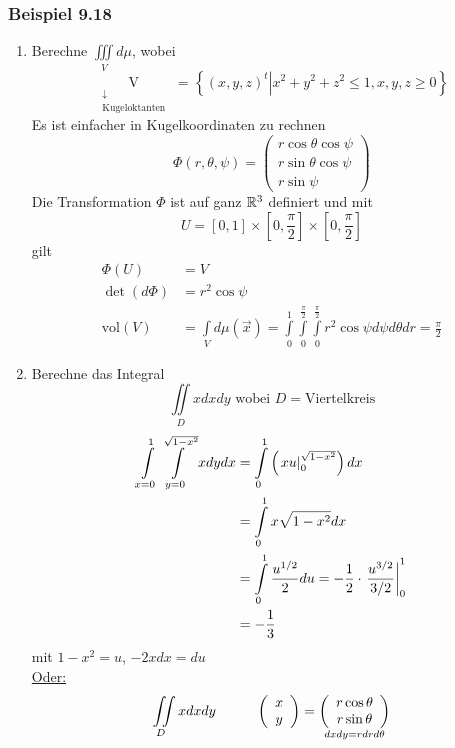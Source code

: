 \subsubsection*{Beispiel 9.18}
\begin{enumerate}
\item Berechne $\iiint\limits_V d\mu$, wobei \[\mathop {\text{V}}\limits_{\begin{array}{*{20}{c}}
 \downarrow \\
{{\text{Kugeloktanten}}}
\end{array}} {\text{ = }}\left\{ {\left. {{{\left( {x,y,z} \right)}^t}} \right|{x^2} + {y^2} + {z^2} \le 1,x,y,z \ge 0} \right\}\] Es ist einfacher in Kugelkoordinaten zu rechnen
\[\Phi \left( {r,\theta ,\psi } \right) = \left( {\begin{array}{*{20}{c}}
{r\cos \theta \cos \psi }\\
{r\sin \theta \cos \psi }\\
{r\sin \psi }
\end{array}} \right)\]
Die Transformation $\Phi$ ist auf ganz $\mathbb{R}^3$ definiert und mit \[U = \left[ {0,1} \right] \times \left[ {0,\frac{\pi }{2}} \right] \times \left[ {0,\frac{\pi }{2}} \right]\]
gilt
\begin{align*}
\Phi\left( U\right) &=V\\
\det\left( d\Phi\right)&=r^2\cos\psi\\
\text{vol}\left(V\right)&=\int\limits_{V} d\mu\left( \vec x\right)=\int\limits_0^1\int\limits_0^{\frac{\pi}{2}}\int\limits_0^{\frac{\pi}{2}} r^2\cos\psi d\psi d\theta dr=\frac{\pi}{2}
\end{align*}
\item Berechne das Integral
\[ \iint\limits_D x dx dy\text{ wobei $D=$Viertelkreis}\]
\begin{align*}
\int\limits_{x = 0}^1 {\int\limits_{y = 0}^{\sqrt {1 - {x^2}} } x } dydx &=\int\limits_0^1 {\left( {\left. {xu} \right|_0^{\sqrt {1 - {x^2}} }} \right)dx} \\
&=\int\limits_0^1 x\sqrt{1-x^2}dx\\
&=\int\limits_0^1 {\frac{{{u^{{1 \mathord{\left/
 {\vphantom {1 2}} \right.
 \kern-\nulldelimiterspace} 2}}}}}{2}} du =  - \frac{1}{2} \cdot \left. {\frac{{{u^{{3 \mathord{\left/
 {\vphantom {3 2}} \right.
 \kern-\nulldelimiterspace} 2}}}}}{{{3 \mathord{\left/
 {\vphantom {3 2}} \right.
 \kern-\nulldelimiterspace} 2}}}} \right|_0^1\\
&=-\frac{1}{3}
\end{align*}
mit $1-x^2=u$, $-2xdx=du$\\
\underline{Oder:}\\
\[ \iint\limits_D x dx dy \hspace{10mm}\left( {\begin{array}{*{20}{c}}
x\\
y
\end{array}} \right) = \mathop {\left( {\begin{array}{*{20}{c}}
{r\cos \theta }\\
{r\sin \theta }
\end{array}} \right)}\limits_{dxdy = rdrd\theta } \]


\end{enumerate}
